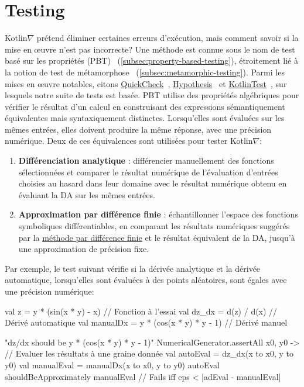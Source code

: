 \section{Testing}\label{sec:testing}

Kotlin$\nabla$ prétend éliminer certaines erreurs d'exécution, mais comment savoir si la mise en œuvre n'est pas incorrecte? Une méthode est connue sous le nom de test basé sur les propriétés (PBT)~\citep{fink1997property} (\autoref{subsec:property-based-testing}), étroitement lié à la notion de test de métamorphose~\citep{chen1998metamorphic} (\autoref{subsec:metamorphic-testing}). Parmi les mises en œuvre notables, citons \href{http://www.cse.chalmers.se/~rjmh/QuickCheck/manual.html}{QuickCheck}~\citep{claessen2011quickcheck}, \href{https://hypothesis.readthedocs.io/en/latest/}{Hypothesis}~\citep{Hypothesis} et \href{https://github.com/kotlintest/kotlintest}{KotlinTest}~\citep{kotlintest}, sur lesquels notre suite de tests est basée. PBT utilise des propriétés algébriques pour vérifier le résultat d'un calcul en construisant des expressions sémantiquement équivalentes mais syntaxiquement distinctes. Lorsqu'elles sont évaluées sur les mêmes entrées, elles doivent produire la même réponse, avec une précision numérique. Deux de ces équivalences sont utilisées pour tester Kotlin$\nabla$: \\
%
\begin{enumerate}
\item \textbf{Différenciation analytique} : différencier manuellement des fonctions sélectionnées et comparer le résultat numérique de l'évaluation d'entrées choisies au hasard dans leur domaine avec le résultat numérique obtenu en évaluant la DA sur les mêmes entrées.
\item \textbf{Approximation par différence finie} : échantillonner l'espace des fonctions symboliques différentiables, en comparant les résultats numériques suggérés par la \hyperref[sec:fdm]{méthode par différence finie} et le résultat équivalent de la DA, jusqu'à une approximation de précision fixe. \\
\end{enumerate}
%
Par exemple, le test suivant vérifie si la dérivée analytique et la dérivée automatique, lorsqu'elles sont évaluées à des points aléatoires, sont égales avec une précision numérique:
%
\begin{kotlinlisting}
val z = y * (sin(x * y) - x)            // Fonction à l'essai
val dz_dx = d(z) / d(x)                 // Dérivé automatique
val manualDx = y * (cos(x * y) * y - 1) // Dérivé manuel

"dz/dx should be y * (cos(x * y) * y - 1)" {
    NumericalGenerator.assertAll { x0, y0 ->
    // Evaluer les résultats à une graine donnée
    val autoEval = dz_dx(x to x0, y to y0)
        val manualEval = manualDx(x to x0, y to y0)
        autoEval shouldBeApproximately manualEval // Fails iff eps < |adEval - manualEval|
    }
}
\end{kotlinlisting}
